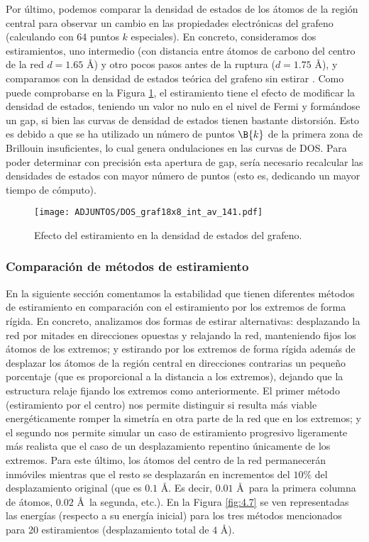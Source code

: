 Por último, podemos comparar la densidad de estados de los átomos de la región central para observar un cambio en las propiedades electrónicas del grafeno (calculando con 64 puntos $k$ especiales). En concreto, consideramos dos estiramientos, uno intermedio (con distancia entre átomos de carbono del centro de la red $d = 1.65$ \AA) y otro pocos pasos antes de la ruptura ($d = 1.75$ \AA), y comparamos con la densidad de estados teórica del grafeno sin estirar . Como puede comprobarse en la Figura \ref{fig:4.16}, el estiramiento tiene el efecto de modificar la densidad de estados, teniendo un valor no nulo en el nivel de Fermi y formándose un gap, si bien las curvas de densidad de estados tienen bastante distorsión. Esto es debido a que se ha utilizado un número de puntos $\B{k}$ de la primera zona de Brillouin insuficientes, lo cual genera ondulaciones en las curvas de DOS. Para poder determinar con precisión esta apertura de gap, sería necesario recalcular las densidades de estados con mayor número de puntos (esto es, dedicando un mayor tiempo de cómputo).  


\begin{figure}[!h]
    \centering
    \texttt{[image: ADJUNTOS/DOS\_graf18x8\_int\_av\_141.pdf]}
    \caption{Efecto del estiramiento en la densidad de estados del grafeno. }
    \label{fig:4.16}
\end{figure}

\subsubsection{Comparación de métodos de estiramiento}
En la siguiente sección comentamos la estabilidad que tienen diferentes métodos de estiramiento en comparación con el estiramiento por los extremos de forma rígida. En concreto, analizamos dos formas de estirar alternativas: desplazando la red por mitades en direcciones opuestas y relajando la red, manteniendo fijos los átomos de los extremos; y estirando por los extremos de forma rígida además de desplazar los átomos de la región central en direcciones contrarias un pequeño porcentaje (que es proporcional a la distancia a los extremos), dejando que la estructura relaje fijando los extremos como anteriormente. El primer método (estiramiento por el centro) nos permite distinguir si resulta más viable energéticamente romper la simetría en otra parte de la red que en los extremos; y el segundo nos permite simular un caso de estiramiento progresivo ligeramente más realista que el caso de un desplazamiento repentino únicamente de los extremos. Para este último, los átomos del centro de la red permanecerán inmóviles mientras que el resto se desplazarán en incrementos del $10\%$ del desplazamiento original (que es $0.1$ \AA. Es decir, $0.01$ \AA \ para la primera columna de átomos, $0.02$ \AA \ la segunda, etc.). En la Figura \ref{fig:4.7} se ven representadas las energías (respecto a su energía inicial) para los tres métodos mencionados para 20 estiramientos (desplazamiento total de $4$ \AA).  \\

